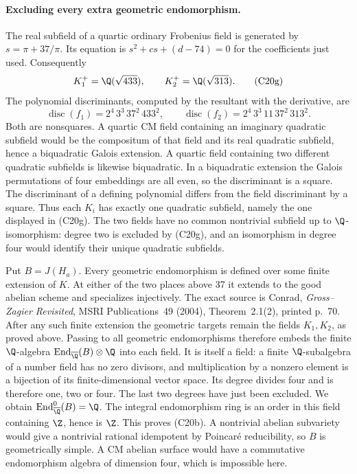 \paragraph{Excluding every extra geometric endomorphism.}
The real subfield of a quartic ordinary Frobenius field is
generated by $s=\pi+37/\pi$. Its equation is
$s^2+c s+(d-74)=0$ for the coefficients just used.
Consequently
\[
 K_1^+=\Q(\sqrt{433}),\qquad
 K_2^+=\Q(\sqrt{313}).
 \tag{C20g}
\]
The polynomial discriminants, computed by the resultant with
the derivative, are
\[
 \operatorname{disc}(f_1)=
       2^4\,3^3\,37^2\,433^2,\qquad
 \operatorname{disc}(f_2)=
       2^4\,3^3\,11\,37^2\,313^2.
 \tag{C20h}
\]
Both are nonsquares. A quartic CM field containing an
imaginary quadratic subfield would be the compositum of
that field and its real quadratic subfield, hence a
biquadratic Galois extension. A quartic field containing
two different quadratic subfields is likewise
biquadratic. In a biquadratic extension the Galois
permutations of four embeddings are all even, so the
discriminant is a square. The discriminant of a defining
polynomial differs from the field discriminant by a
square. Thus each $K_i$ has exactly one quadratic
subfield, namely the one displayed in (C20g).
The two fields have no common nontrivial subfield up to
$\Q$-isomorphism: degree two is excluded by (C20g), and
an isomorphism in degree four would identify their unique
quadratic subfields.

Put $B=J(H_a)$. Every geometric endomorphism is defined
over some finite extension of $K$. At either of the two
places above 37 it extends to the good abelian scheme and
specializes injectively. The exact source is Conrad,
\emph{Gross--Zagier Revisited}, MSRI Publications~49
(2004), Theorem~2.1(2), printed p.~70.
After any such finite extension the geometric targets
remain the fields $K_1,K_2$, as proved above. Passing to
all geometric endomorphisms therefore embeds the finite
$\Q$-algebra
$\operatorname{End}_{\overline\Q}(B)\otimes\Q$
into each field. It is itself a field: a finite
$\Q$-subalgebra of a number field has no zero divisors,
and multiplication by a nonzero element is a bijection
of its finite-dimensional vector space. Its degree
divides four and is therefore one, two or four.
The last two degrees have just been excluded.
We obtain $\operatorname{End}_{\overline\Q}^0(B)=\Q$.
The integral endomorphism ring is an order in this
field containing $\Z$, hence is $\Z$. This proves
(C20b). A nontrivial abelian subvariety would give a
nontrivial rational idempotent by Poincar\'e
reducibility, so $B$ is geometrically simple.
A CM abelian surface would have a commutative
endomorphism algebra of dimension four, which is
impossible here.

